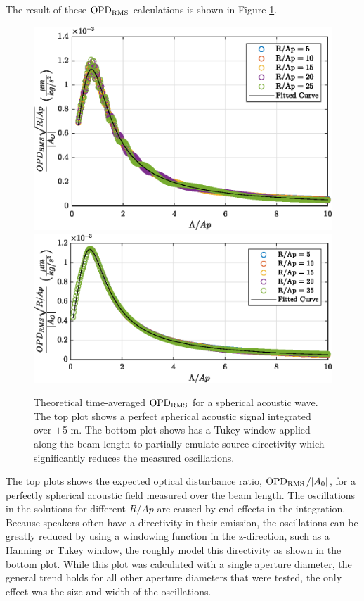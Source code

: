 The result of these $\operatorname{OPD_{RMS}}$ calculations is shown in Figure \ref{fig:03_spherical_sample}.
\begin{figure}
  \centering
  \includegraphics{../matlab/03_aero_optics_acoustics/spherical_sample.eps}
  \includegraphics{../matlab/03_aero_optics_acoustics/spherical_sample_win.eps}
  \caption{Theoretical time-averaged $\operatorname{OPD_{RMS}}$ for a spherical acoustic wave. The top plot shows a perfect spherical acoustic signal integrated over $\pm$5-m. The bottom plot shows has a Tukey window applied along the beam length to partially emulate source directivity which significantly reduces the measured oscillations.}
  \label{fig:03_spherical_sample}
\end{figure}
The top plots shows the expected optical disturbance ratio, $\operatorname{OPD_{RMS}}/|A_0|$, for a perfectly spherical acoustic field measured over the beam length.
The oscillations in the solutions for different $R/Ap$ are caused by end effects in the integration.
Because speakers often have a directivity in their emission, the oscillations can be greatly reduced by using a windowing function in the z-direction, such as a Hanning or Tukey window, the roughly model this directivity as shown in the bottom plot.
While this plot was calculated with a single aperture diameter, the general trend holds for all other aperture diameters that were tested, the only effect was the size and width of the oscillations.

